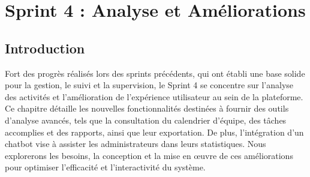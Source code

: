 \chapter{Sprint 4 : Analyse et Améliorations}
\section{Introduction}
Fort des progrès réalisés lors des sprints précédents, qui ont établi une base solide pour la gestion, le suivi et la supervision, le Sprint 4 se concentre sur l’analyse des activités et l’amélioration de l’expérience utilisateur au sein de la plateforme. 
Ce chapitre détaille les nouvelles fonctionnalités destinées à fournir des outils d’analyse avancés, tels que la consultation du calendrier d’équipe, des tâches accomplies et des rapports, ainsi que leur exportation.
De plus, l’intégration d’un chatbot vise à assister les administrateurs dans leurs statistiques. Nous explorerons les besoins, la conception et la mise en œuvre de ces améliorations pour optimiser l’efficacité et l’interactivité du système.
